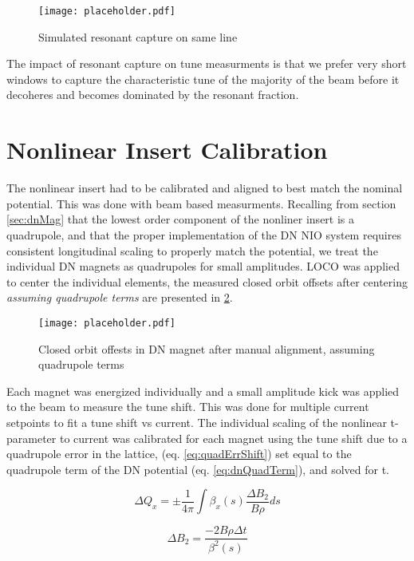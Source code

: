 \begin{figure}
	\centering
	\texttt{[image: placeholder.pdf]}
	\caption{Simulated resonant capture on same line}
	\label{fig:simResCap}
\end{figure}

The impact of resonant capture on tune measurments is that we prefer very short windows to capture the characteristic tune of the majority of the beam before it decoheres and becomes dominated by the resonant fraction.

\section{Nonlinear Insert Calibration} \label{sec:nioCal}
The nonlinear insert had to be calibrated and aligned to best match the nominal potential. This was done with beam based measurments. Recalling from section \ref{sec:dnMag} that the lowest order component of the nonliner insert is a quadrupole, and that the proper implementation of the DN NIO system requires consistent longitudinal scaling to properly match the potential, we treat the individual DN magnets as quadrupoles for small amplitudes. LOCO was applied to center the individual elements, the measured closed orbit offsets after centering \textit{assuming quadrupole terms} are presented in \ref{fig:dnOffset}. 

\begin{figure}
	\centering
	\texttt{[image: placeholder.pdf]}
	\caption{Closed orbit offests in DN magnet after manual alignment, assuming quadrupole terms}
	\label{fig:dnOffset}
\end{figure}


Each magnet was energized individually and a small amplitude kick was applied to the beam to measure the tune shift. This was done for multiple current setpoints to fit a tune shift vs current.
The individual scaling of the nonlinear t-parameter to current was calibrated for each magnet using the tune shift due to a quadrupole error in the lattice, (eq. \ref{eq:quadErrShift}) set equal to the quadrupole term of the DN potential (eq. \ref{eq:dnQuadTerm}), and solved for t.

\begin{equation}
    	\Delta Q_{x} = \pm \frac{1}{4\pi}\int{\beta_x(s) \frac{\Delta B_2}{B\rho} ds}
    	\label{eq:quadErrShift}
\end{equation}

\begin{equation}
	\Delta B_2 = \frac{-2B\rho \Delta t}{\beta^2(s)}
	\label{eq:dnQuadTerm}
\end{equation}

